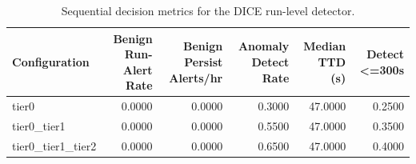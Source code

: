 \begin{table}[t]
\centering
\caption{Sequential decision metrics for the DICE run-level detector.}
\label{tab:dice_sequential_metrics}
\footnotesize
\begin{tabular}{lrrrrr}
\toprule
Configuration & Benign Run-Alert Rate & Benign Persist Alerts/hr & Anomaly Detect Rate & Median TTD (s) & Detect <=300s \\
\midrule
tier0 & 0.0000 & 0.0000 & 0.3000 & 47.0000 & 0.2500 \\
tier0_tier1 & 0.0000 & 0.0000 & 0.5500 & 47.0000 & 0.3500 \\
tier0_tier1_tier2 & 0.0000 & 0.0000 & 0.6500 & 47.0000 & 0.4000 \\
\bottomrule
\end{tabular}

\end{table}
